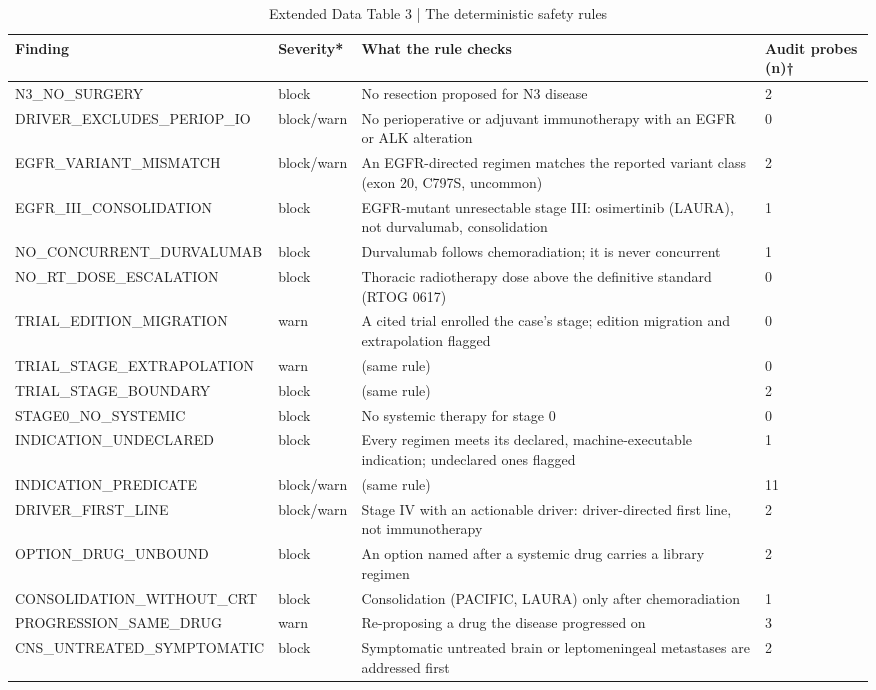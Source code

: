 \begin{table}[t]
\small
\caption{Extended Data Table 3 | The deterministic safety rules}
\begin{tabular}{p{4.4cm}p{1.4cm}p{7.6cm}p{1.6cm}}
\toprule
Finding & Severity* & What the rule checks & Audit probes (n)† \\
\midrule
N3\_NO\_SURGERY & block & No resection proposed for N3 disease & 2 \\
DRIVER\_EXCLUDES\_PERIOP\_IO & block/warn & No perioperative or adjuvant immunotherapy with an EGFR or ALK alteration & 0 \\
EGFR\_VARIANT\_MISMATCH & block/warn & An EGFR-directed regimen matches the reported variant class (exon 20, C797S, uncommon) & 2 \\
EGFR\_III\_CONSOLIDATION & block & EGFR-mutant unresectable stage III: osimertinib (LAURA), not durvalumab, consolidation & 1 \\
NO\_CONCURRENT\_DURVALUMAB & block & Durvalumab follows chemoradiation; it is never concurrent & 1 \\
NO\_RT\_DOSE\_ESCALATION & block & Thoracic radiotherapy dose above the definitive standard (RTOG 0617) & 0 \\
TRIAL\_EDITION\_MIGRATION & warn & A cited trial enrolled the case's stage; edition migration and extrapolation flagged & 0 \\
TRIAL\_STAGE\_EXTRAPOLATION & warn & (same rule) & 0 \\
TRIAL\_STAGE\_BOUNDARY & block & (same rule) & 2 \\
STAGE0\_NO\_SYSTEMIC & block & No systemic therapy for stage 0 & 0 \\
INDICATION\_UNDECLARED & block & Every regimen meets its declared, machine-executable indication; undeclared ones flagged & 1 \\
INDICATION\_PREDICATE & block/warn & (same rule) & 11 \\
DRIVER\_FIRST\_LINE & block/warn & Stage IV with an actionable driver: driver-directed first line, not immunotherapy & 2 \\
OPTION\_DRUG\_UNBOUND & block & An option named after a systemic drug carries a library regimen & 2 \\
CONSOLIDATION\_WITHOUT\_CRT & block & Consolidation (PACIFIC, LAURA) only after chemoradiation & 1 \\
PROGRESSION\_SAME\_DRUG & warn & Re-proposing a drug the disease progressed on & 3 \\
CNS\_UNTREATED\_SYMPTOMATIC & block & Symptomatic untreated brain or leptomeningeal metastases are addressed first & 2 \\

\end{tabular}
\end{table}
